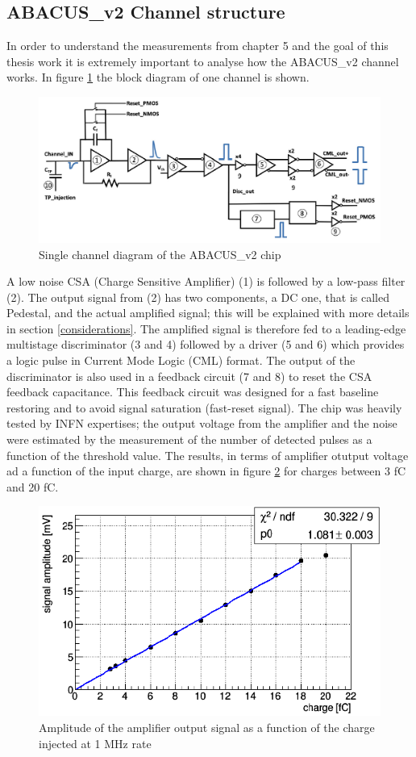 \subsection{ABACUS\_v2 Channel structure}
In order to understand the measurements from chapter 5 and the goal of this thesis work it is extremely important to analyse how the ABACUS\_v2 channel works.
In figure \ref{fig:abacuschannel} the block diagram of one channel is shown.
\begin{figure}[H]
	\centering
	\includegraphics[width=0.8\linewidth]{IMG/ch2/Abacus_channel.png}
	\caption{Single channel diagram of the ABACUS\_v2 chip}
	\label{fig:abacuschannel}
\end{figure}
\noindent A low noise CSA (Charge Sensitive Amplifier) (1) is followed by a low-pass filter (2).
The output signal from (2) has two components, a DC one, that is called Pedestal, and the actual amplified signal; this will be explained with more details in section \ref{considerations}.
The amplified signal is therefore fed to a leading-edge multistage discriminator (3 and 4) followed by a driver (5 and 6) which provides a logic pulse in Current Mode Logic (CML) format.
The output of the discriminator is also used in a feedback circuit (7 and 8) to reset the CSA feedback capacitance. This feedback circuit was designed for a fast baseline restoring and to avoid signal saturation (fast-reset signal).
The chip was heavily tested by INFN expertises; the output voltage from the amplifier and the noise were estimated by the measurement of the number of detected pulses as a function of the threshold value. The results, in terms of amplifier otutput voltage ad a function of the input charge, are shown in figure \ref{fig:abacustest} for charges between 3 fC and 20 fC\cite{abacus}.
\begin{figure}[H]
	\centering
	\includegraphics[width=0.6\linewidth]{IMG/ch2/ABACUSTEST}
	\caption{Amplitude of the amplifier output signal as a function of the charge injected at 1 MHz rate}
	\label{fig:abacustest}
\end{figure}
